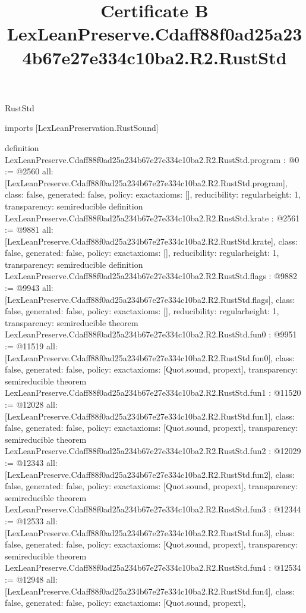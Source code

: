 \begin{lexlean}{RustStd}
\title{Certificate B LexLeanPreserve.Cdaff88f0ad25a234b67e27e334c10ba2.R2.RustStd}
\begin{coremodule}
imports [LexLeanPreservation.RustSound]

definition LexLeanPreserve.Cdaff88f0ad25a234b67e27e334c10ba2.R2.RustStd.program : @0 := @2560 {
  all: [LexLeanPreserve.Cdaff88f0ad25a234b67e27e334c10ba2.R2.RustStd.program],
  class: false,
  generated: false,
  policy: exact{axioms: []},
  reducibility: regular{height: 1},
  transparency: semireducible
}
definition LexLeanPreserve.Cdaff88f0ad25a234b67e27e334c10ba2.R2.RustStd.krate : @2561 := @9881 {
  all: [LexLeanPreserve.Cdaff88f0ad25a234b67e27e334c10ba2.R2.RustStd.krate],
  class: false,
  generated: false,
  policy: exact{axioms: []},
  reducibility: regular{height: 1},
  transparency: semireducible
}
definition LexLeanPreserve.Cdaff88f0ad25a234b67e27e334c10ba2.R2.RustStd.flags : @9882 := @9943 {
  all: [LexLeanPreserve.Cdaff88f0ad25a234b67e27e334c10ba2.R2.RustStd.flags],
  class: false,
  generated: false,
  policy: exact{axioms: []},
  reducibility: regular{height: 1},
  transparency: semireducible
}
theorem LexLeanPreserve.Cdaff88f0ad25a234b67e27e334c10ba2.R2.RustStd.fun0 : @9951 := @11519 {
  all: [LexLeanPreserve.Cdaff88f0ad25a234b67e27e334c10ba2.R2.RustStd.fun0],
  class: false,
  generated: false,
  policy: exact{axioms: [Quot.sound, propext]},
  transparency: semireducible
}
theorem LexLeanPreserve.Cdaff88f0ad25a234b67e27e334c10ba2.R2.RustStd.fun1 : @11520 := @12028 {
  all: [LexLeanPreserve.Cdaff88f0ad25a234b67e27e334c10ba2.R2.RustStd.fun1],
  class: false,
  generated: false,
  policy: exact{axioms: [Quot.sound, propext]},
  transparency: semireducible
}
theorem LexLeanPreserve.Cdaff88f0ad25a234b67e27e334c10ba2.R2.RustStd.fun2 : @12029 := @12343 {
  all: [LexLeanPreserve.Cdaff88f0ad25a234b67e27e334c10ba2.R2.RustStd.fun2],
  class: false,
  generated: false,
  policy: exact{axioms: [Quot.sound, propext]},
  transparency: semireducible
}
theorem LexLeanPreserve.Cdaff88f0ad25a234b67e27e334c10ba2.R2.RustStd.fun3 : @12344 := @12533 {
  all: [LexLeanPreserve.Cdaff88f0ad25a234b67e27e334c10ba2.R2.RustStd.fun3],
  class: false,
  generated: false,
  policy: exact{axioms: [Quot.sound, propext]},
  transparency: semireducible
}
theorem LexLeanPreserve.Cdaff88f0ad25a234b67e27e334c10ba2.R2.RustStd.fun4 : @12534 := @12948 {
  all: [LexLeanPreserve.Cdaff88f0ad25a234b67e27e334c10ba2.R2.RustStd.fun4],
  class: false,
  generated: false,
  policy: exact{axioms: [Quot.sound, propext]},
}
\end{coremodule}
\end{lexlean}

